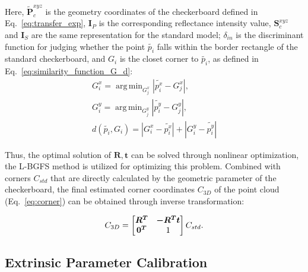 \documentclass[journal]{vgtc}
\DeclareMathOperator*{\argmin}{arg\,min}
\begin{document}
Here, $\tilde {\bm P}^{xyz}_c$ is the geometry coordinates of the checkerboard defined in Eq.~\ref{eq:transfer_exp}, $\bm I_P$ is the corresponding reflectance intensity value, $\bm S^{xyz}_c$ and $\bm I_S$ are the same representation for the standard model; $\delta_{in}$ is the discriminant function for judging whether the point $\tilde{p_i}$ falls within the border rectangle of the standard checkerboard, and $G_i$ is the closet corner to $\tilde{p_i}$, as defined in Eq.~\ref{eq:similarity_function_G_d}:
\begin{equation}
	\begin{aligned}
		\label{eq:similarity_function_G_d}                                        
		G^x_i = \argmin_{G^x_j} {|\tilde{p^x_i} - G^x_j|},                        
		                                                                          \\
		G^y_i = \argmin_{G^y_j} {|\tilde{p^y_i} - G^y_j|},                        
		                                                                          \\
		d( \tilde{p_i}, G_i ) = |G^x_i - \tilde{p^x_i}| + |G^y_i - \tilde{p^y_i}| 
	\end{aligned}
\end{equation}

Thus, the optimal solution of $\bm R, \bm t$ can be solved through nonlinear optimization, the L-BGFS\cite{byrd1995limited} method is utilized for optimizing this problem. Combined with corners $C_{std}$ that are directly calculated by the geometric parameter of the checkerboard, the final estimated corner coordinates $C_{3D}$ of the point cloud (Eq.~\ref{eq:corner}) can be obtained through inverse transformation:

\begin{equation}
	\label{eq:corner}
	\centering
	\begin{matrix}
		C_{3D}
		=
		\left [
		\begin{matrix}
		\bm {R^T} & \bm {-R^T} \bm {t} \\
		\bm {0^T} & 1                  
	\end{matrix}
	\right]
	C_{std}.
	\end{matrix}
\end{equation}



\subsection{Extrinsic Parameter Calibration}
\end{document}
